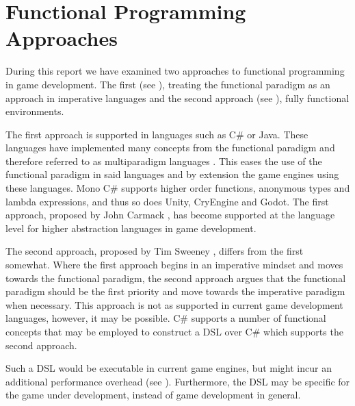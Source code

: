 \section{Functional Programming Approaches}
During this report we have examined two approaches to functional programming in game development. The first (see ), treating the functional paradigm as an approach in imperative languages and the second approach (see ), fully functional environments.

The first approach is supported in languages such as C\# or Java. These languages have implemented many concepts from the functional paradigm and therefore referred to as multiparadigm languages \cite{albahari2017c, raffles2018history}. This eases the use of the functional paradigm in said languages and by extension the game engines using these languages. Mono C\# supports higher order functions, anonymous types and lambda expressions, and thus so does Unity, CryEngine and Godot. The first approach, proposed by John Carmack \cite{gamasutra:c++functional}, has become supported at the language level for higher abstraction languages in game development.

The second approach, proposed by Tim Sweeney \cite{theNextMainstreanProgrammingLanguage}, differs from the first somewhat. Where the first approach begins in an imperative mindset and moves towards the functional paradigm, the second approach argues that the functional paradigm should be the first priority and move towards the imperative paradigm when necessary. This approach is not as supported in current game development languages, however, it may be possible. C\# supports a number of functional concepts that may be employed to construct a \ac{DSL} over C\# which supports the second approach.

Such a \ac{DSL} would be executable in current game engines, but might incur an additional performance overhead (see ). Furthermore, the \ac{DSL} may be specific for the game under development, instead of game development in general.
